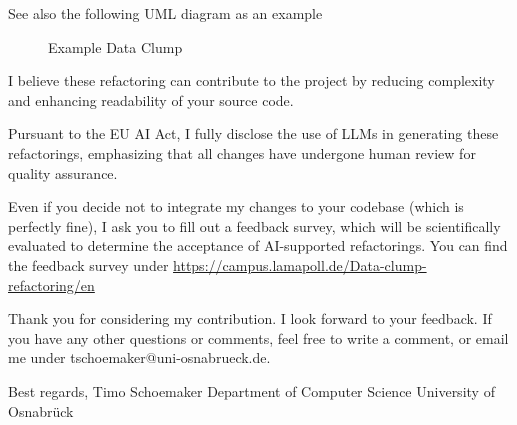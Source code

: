 \begin{appendices}
See also the following UML diagram as an example
\begin{figure}[htpb!]
    \centering
    
    \caption{Example Data Clump}
    \label{fig:enter-label}
\end{figure}
    



I believe these refactoring can contribute to the project by reducing complexity and enhancing readability of your source code.

Pursuant to the EU AI Act, I fully disclose the use of LLMs in generating these refactorings, emphasizing that all changes have undergone human review for quality assurance. 


Even if you decide not to integrate my changes to your codebase (which is perfectly fine), I ask you to fill out a feedback survey, which will be scientifically evaluated to determine the acceptance of AI-supported refactorings. You can find the feedback survey under \url{https://campus.lamapoll.de/Data-clump-refactoring/en}


Thank you for considering my contribution. I look forward to your feedback. If you have any other questions or comments, feel free to write a comment, or email me under tschoemaker@uni-osnabrueck.de.
\newline

Best regards,\newline
Timo Schoemaker \newline
Department of Computer Science \newline
University of Osnabrück \newline



\end{appendices}
	
